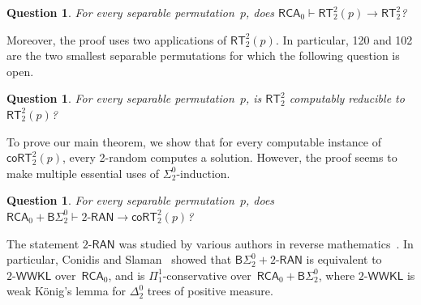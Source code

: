 \documentclass{article}
\numberwithin{theorem}{section}
\newtheorem{question}[theorem]{Question}
\newcommand{\BSig}{\mathsf{B}\Sigma^0}
\newcommand{\RCA}[0]{\mathsf{RCA}}
\newcommand{\EM}[0]{\mathsf{EM}}
\newcommand{\RT}[0]{\mathsf{RT}}
\newcommand{\WWKLs}[1]{#1\mbox{-}\mathsf{WWKL}}
\newcommand{\RANs}[1]{#1\mbox{-}\mathsf{RAN}}
\newcommand{\coRT}[0]{\mathsf{coRT}}
\begin{document}
\begin{question}
For every separable permutation~$p$, does $\RCA_0 \vdash \RT^2_2(p) \to \RT^2_2$?
\end{question}

Moreover, the proof uses two applications of $\RT^2_2(p)$. In particular, 120 and 102 are the two smallest separable permutations for which the following question is open.

\begin{question}
For every separable permutation~$p$, is $\RT^2_2$ computably reducible to $\RT^2_2(p)$?
\end{question}

To prove our main theorem, we show that for every computable instance of $\coRT^2_2(p)$, every 2-random computes a solution. However, the proof seems to make multiple essential uses of $\Sigma^0_2$-induction.

\begin{question}
For every separable permutation~$p$, does $\RCA_0 + \BSig_2 \vdash \RANs{2} \to \coRT^2_2(p)$?
\end{question}

The statement $\RANs{2}$ was studied by various authors in reverse mathematics~\cite{conidis2013random,nies2020randomness,belanger2021where}. In particular, Conidis and Slaman~\cite{conidis2013random} showed that $\BSig_2 + \RANs{2}$ is equivalent to $\WWKLs{2}$ over~$\RCA_0$, and is $\Pi^1_1$-conservative over~$\RCA_0 + \BSig_2$, where $\WWKLs{2}$ is weak K\"onig's lemma for $\Delta^0_2$ trees of positive measure. 




\end{document}
